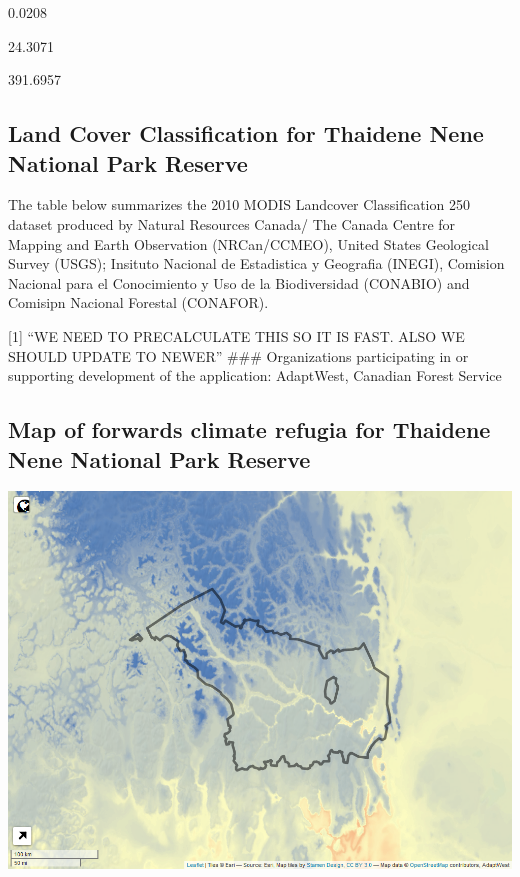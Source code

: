 \documentclass[
]{article}
\begin{document}
0.0208

24.3071

391.6957

\hypertarget{land-cover-classification-for-thaidene-nene-national-park-reserve}{%
\subsection{Land Cover Classification for Thaidene Nene National Park
Reserve}\label{land-cover-classification-for-thaidene-nene-national-park-reserve}}

The table below summarizes the 2010 MODIS Landcover Classification 250
dataset produced by Natural Resources Canada/ The Canada Centre for
Mapping and Earth Observation (NRCan/CCMEO), United States Geological
Survey (USGS); Insituto Nacional de Estadistica y Geografia (INEGI),
Comision Nacional para el Conocimiento y Uso de la Biodiversidad
(CONABIO) and Comisipn Nacional Forestal (CONAFOR).

{[}1{]} ``WE NEED TO PRECALCULATE THIS SO IT IS FAST. ALSO WE SHOULD
UPDATE TO NEWER\nVERSION'' \#\#\# Organizations participating in or
supporting development of the application: AdaptWest, Canadian Forest
Service

\pagebreak

\hypertarget{map-of-forwards-climate-refugia-for-thaidene-nene-national-park-reserve}{%
\subsection{Map of forwards climate refugia for Thaidene Nene National
Park
Reserve}\label{map-of-forwards-climate-refugia-for-thaidene-nene-national-park-reserve}}

\begin{center}\includegraphics[width=0.7\linewidth]{./fwsvel} \end{center}
\end{document}
